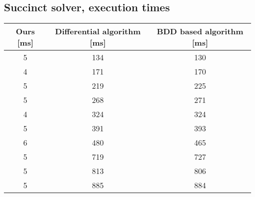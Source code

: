 \documentclass{report}
\begin{document}
\subsection{Succinct solver, execution times}
\begin{center}
	\begin{tabular}{ | c | c | c | }
		\hline
		Ours [ms] & Differential algorithm [ms] & BDD based algorithm [ms] \\
		\hline
		\hline
		5 & 134 & 130 \\
		4 & 171 & 170 \\
		5 & 219 & 225 \\
		5 & 268 & 271 \\
		4 & 324 & 324 \\
		5 & 391 & 393 \\
		6 & 480 & 465 \\
		5 & 719 & 727 \\
		5 & 813 & 806 \\
		5 & 885 & 884 \\
		\hline
	\end{tabular}
\end{center}
\end{document}
